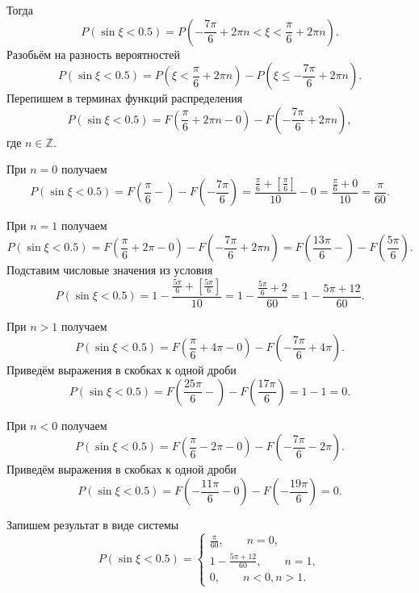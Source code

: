 \begin{enumerate}[label=\alph*)]
Тогда
$$P \left( \sin \xi < 0.5 \right) =
P \left( - \frac{7 \pi }{6} + 2 \pi n< \xi < \frac{ \pi }{6} + 2 \pi n \right).$$
Разобьём на разность вероятностей
$$P \left( \sin \xi < 0.5 \right) =
P \left( \xi < \frac{ \pi }{6} + 2 \pi n \right) - P \left( \xi \leq - \frac{7 \pi }{6} + 2 \pi n \right).$$
Перепишем в терминах функций распределения
$$P \left( \sin \xi < 0.5 \right) =
F \left( \frac{ \pi }{6} + 2 \pi n - 0 \right) - F \left( - \frac{7 \pi }{6} + 2 \pi n \right),$$
где $n \in \mathbb{Z}.$

При $n = 0$ получаем
$$P \left( \sin \xi < 0.5 \right) =
F \left( \frac{ \pi }{6} - \right) - F \left( - \frac{7 \pi }{6} \right) =
\frac{ \frac{ \pi }{6} + \left[ \frac{ \pi }{6} \right] }{10} - 0 =
\frac{ \frac{ \pi }{6} + 0}{10} =
\frac{ \pi }{60}.$$

При $n=1$ получаем
$$P \left( \sin \xi < 0.5 \right) =
F \left( \frac{ \pi }{6} + 2 \pi - 0 \right) - F \left( - \frac{7 \pi }{6} + 2 \pi n \right) =
F \left( \frac{13 \pi }{6} - \right) - F \left( \frac{5 \pi }{6} \right).$$
Подставим числовые значения из условия
$$P \left( \sin \xi < 0.5 \right) =
1 - \frac{ \frac{5 \pi }{6} + \left[ \frac{5 \pi }{6} \right] }{10} =
1 - \frac{ \frac{5 \pi }{6} + 2}{60} =
1 - \frac{5 \pi + 12}{60}.$$

При $n > 1$ получаем
$$P \left( \sin \xi < 0.5 \right) =
F \left( \frac{ \pi }{6} + 4 \pi - 0 \right) - F \left( - \frac{7 \pi }{6} + 4 \pi \right).$$
Приведём выражения в скобках к одной дроби
$$P \left( \sin \xi < 0.5 \right) =
F \left( \frac{25 \pi }{6} - \right) - F \left( \frac{17 \pi }{6} \right) =
1 - 1 = 0.$$

При $n < 0$ получаем
$$P \left( \sin \xi < 0.5 \right) =
F \left( \frac{ \pi }{6} - 2 \pi - 0 \right) - F \left( - \frac{7 \pi }{6} - 2 \pi \right).$$
Приведём выражения в скобках к одной дроби
$$P \left( \sin \xi < 0.5 \right) =
F \left( - \frac{11 \pi }{6} - 0 \right) - F \left( - \frac{19 \pi }{6} \right) =
0.$$

Запишем результат в виде системы
$$P \left( \sin \xi < 0.5 \right) =
\begin{cases}
\frac{ \pi }{60}, \qquad n = 0, \\
1 - \frac{5 \pi + 12}{60}, \qquad n = 1, \\
0, \qquad n < 0, n > 1.
\end{cases}$$


\end{enumerate}
